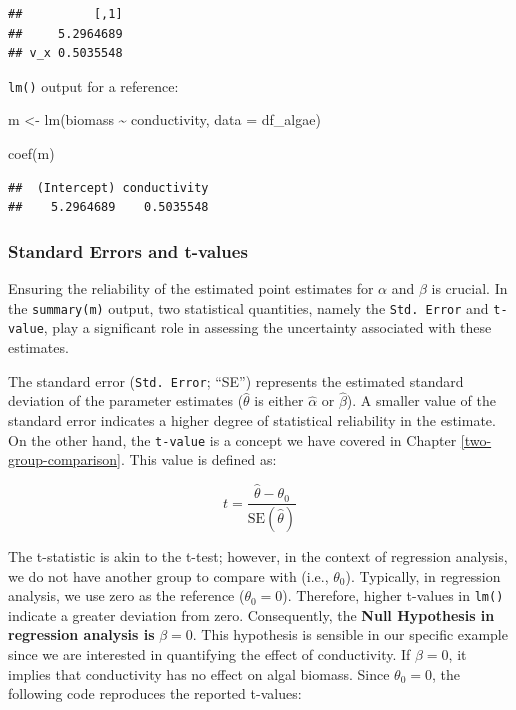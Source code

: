 \documentclass[
]{article}
\newenvironment{Shaded}{\begin{snugshade}}{\end{snugshade}}
\newcommand{\AttributeTok}[1]{\textcolor[rgb]{0.77,0.63,0.00}{#1}}
\newcommand{\FunctionTok}[1]{\textcolor[rgb]{0.00,0.00,0.00}{#1}}
\newcommand{\NormalTok}[1]{#1}
\newcommand{\OtherTok}[1]{\textcolor[rgb]{0.56,0.35,0.01}{#1}}
\newcommand{\SpecialCharTok}[1]{\textcolor[rgb]{0.00,0.00,0.00}{#1}}
\begin{document}
\begin{verbatim}
##          [,1]
##     5.2964689
## v_x 0.5035548
\end{verbatim}

\texttt{lm()} output for a reference:

\begin{Shaded}
\begin{Highlighting}[]
\NormalTok{m }\OtherTok{\textless{}{-}} \FunctionTok{lm}\NormalTok{(biomass }\SpecialCharTok{\textasciitilde{}}\NormalTok{ conductivity,}
        \AttributeTok{data =}\NormalTok{ df\_algae)}

\FunctionTok{coef}\NormalTok{(m)}
\end{Highlighting}
\end{Shaded}

\begin{verbatim}
##  (Intercept) conductivity 
##    5.2964689    0.5035548
\end{verbatim}

\hypertarget{standard-errors-and-t-values}{%
\subsubsection{Standard Errors and t-values}\label{standard-errors-and-t-values}}

Ensuring the reliability of the estimated point estimates for \(\alpha\) and \(\beta\) is crucial. In the \texttt{summary(m)} output, two statistical quantities, namely the \texttt{Std.\ Error} and \texttt{t-value}, play a significant role in assessing the uncertainty associated with these estimates.

The standard error (\texttt{Std.\ Error}; ``SE'') represents the estimated standard deviation of the parameter estimates (\(\hat{\theta}\) is either \(\hat{\alpha}\) or \(\hat{\beta}\)). A smaller value of the standard error indicates a higher degree of statistical reliability in the estimate. On the other hand, the \texttt{t-value} is a concept we have covered in Chapter \ref{two-group-comparison}. This value is defined as:

\[
t = \frac{\hat{\theta} - \theta_0}{\text{SE}(\hat{\theta})}
\]

The t-statistic is akin to the t-test; however, in the context of regression analysis, we do not have another group to compare with (i.e., \(\theta_0\)). Typically, in regression analysis, we use zero as the reference (\(\theta_0 = 0\)). Therefore, higher t-values in \texttt{lm()} indicate a greater deviation from zero. Consequently, the \textbf{Null Hypothesis in regression analysis is} \(\beta = 0\). This hypothesis is sensible in our specific example since we are interested in quantifying the effect of conductivity. If \(\beta = 0\), it implies that conductivity has no effect on algal biomass. Since \(\theta_0 = 0\), the following code reproduces the reported t-values:
\end{document}
